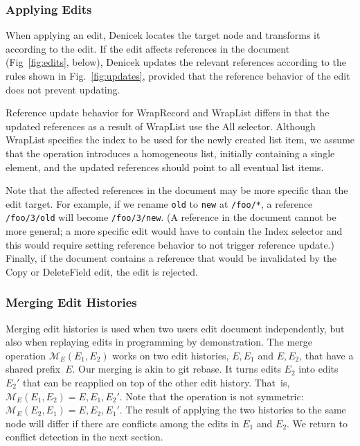 \documentclass[sigconf]{acmart}
\newcommand{\ident}[1]{{\sffamily #1}}
\begin{document}
\subsubsection*{Applying Edits}
When applying an edit, Denicek locates the target node and transforms it according to the edit. If
the edit affects references in the document (Fig~\ref{fig:edits}, below), Denicek updates
the relevant references according to the rules shown in Fig.~\ref{fig:updates}, provided
that the reference behavior of the edit does not prevent updating.

Reference update behavior for \ident{WrapRecord} and \ident{WrapList} differs in that the updated
references as a result of \ident{WrapList} use the \ident{All} selector. Although \ident{WrapList}
specifies the index to be used for the newly created list item, we assume that the operation
introduces a homogeneous list, initially containing a single element, and the updated references
should point to all eventual list items.

Note that the affected references in the document may be more specific than the edit target. For
example, if we rename {\small\Verb|old|} to {\small\Verb|new|} at {\small\Verb|/foo/*|}, a reference
{\small\Verb|/foo/3/old|} will become {\small\Verb|/foo/3/new|}. (A reference in the
document cannot be more general; a more specific edit would have to contain the \ident{Index} selector
and this would require setting reference behavior to not trigger reference update.) Finally,
if the document contains a reference that would be invalidated by the \ident{Copy} or
\ident{DeleteField} edit, the edit is rejected.



\subsubsection*{Merging Edit Histories}
Merging edit histories is used when two users edit document independently, but also
when replaying edits in programming by demonstration. The merge operation $\mathcal{M}_E(E_1, E_2)$
works on two edit histories, $E, E_1$ and $E, E_2$, that have a shared prefix~$E$.
Our merging is akin to git rebase. It turns edits $E_2$ into edits $E_2'$ that can be reapplied
on top of the other edit history. That~is, $\mathcal{M}_E(E_1, E_2) = E, E_1, E_2'$.
Note that the operation is not symmetric: $\mathcal{M}_E(E_2, E_1) = E, E_2, E_1'$. The
result of applying the two histories to the same node will differ if there are conflicts
among the edits in $E_1$ and $E_2$. We return to conflict detection in the next section.
\end{document}
